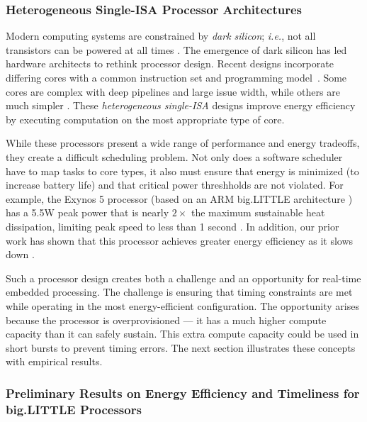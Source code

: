  
\subsubsection{Heterogeneous Single-ISA Processor Architectures}
Modern computing systems are constrained by \emph{dark silicon};
\emph{i.e.}, not all transistors can be powered at all times
\cite{DaSi2011,Venkatesh2010}.  The emergence of dark silicon has led
hardware architects to rethink processor design.  Recent designs
incorporate differing cores with a common instruction set and
programming model~\cite{Kumar.2005.heterogeneous,SulemanMQP09}.  Some
cores are complex with deep pipelines and large issue width, while
others are much simpler \cite{bigLittle}.  These \emph{heterogeneous
single-ISA} designs improve energy efficiency by executing computation
on the most appropriate type of core.

While these processors present a wide range of performance and energy
tradeoffs, they create a difficult scheduling problem.  Not only does
a software scheduler have to map tasks to core types, it also must
ensure that energy is minimized (to increase battery life) and that
critical power threshholds are not violated.  For example, the Exynos
5 processor (based on an ARM big.LITTLE architecture \cite{bigLittle})
has a 5.5W peak power that is nearly $2 \times$ the maximum
sustainable heat dissipation, limiting peak speed to less than 1
second \cite{exynos5}.  In addition, our prior work has shown that
this processor achieves greater energy efficiency as it slows down
\cite{Imes2014}.  

Such a processor design creates both a challenge and an opportunity
for real-time embedded processing. The challenge is ensuring that
timing constraints are met while operating in the most
energy-efficient configuration.  The opportunity arises because the
processor is overprovisioned --- it has a much higher compute capacity
than it can safely sustain.  This extra compute capacity could be used
in short bursts to prevent timing errors.  The next section
illustrates these concepts with empirical results.

\subsubsection{Preliminary Results on Energy Efficiency and Timeliness for big.LITTLE Processors}

